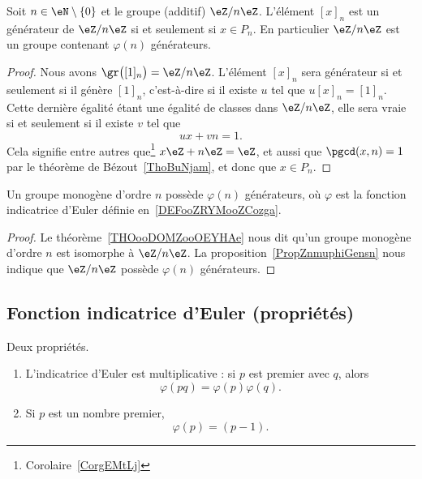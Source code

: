 \begin{proposition}     \label{PropZnmuphiGensn}
	Soit \( n\in\eN\setminus\{ 0 \}\) et le groupe (additif) \( \eZ/n\eZ\). L'élément \( [x]_n\) est un générateur de \( \eZ/n\eZ\) si et seulement si \( x\in P_n\). En particulier \( \eZ/n\eZ\) est un groupe contenant \( \varphi(n)\) générateurs.
\end{proposition}

\begin{proof}
	Nous avons \( \gr\big( [1]_n \big)=\eZ/n\eZ\). L'élément \( [x]_n\) sera générateur si et seulement si il génère \( [1]_n \), c'est-à-dire si il existe \( u\) tel que \( u[x]_n=[1]_n\). Cette dernière égalité étant une égalité de classes dans \( \eZ/n\eZ\), elle sera vraie si et seulement si il existe \( v\) tel que
	\begin{equation}
		ux+vn=1.
	\end{equation}
	Cela signifie entre autres que\footnote{Corolaire~\ref{CorgEMtLj}} \( x\eZ+n\eZ=\eZ\), et aussi que \( \pgcd(x,n)=1\) par le théorème de Bézout~\ref{ThoBuNjam}, et donc que \( x\in P_n\).
\end{proof}

\begin{corollary}\label{CORooMBLSooMHKmAq}
	Un groupe monogène d'ordre \( n\) possède \( \varphi(n)\) générateurs, où \( \varphi\) est la fonction indicatrice d'Euler définie en~\ref{DEFooZRYMooZCozga}.
\end{corollary}

\begin{proof}
	Le théorème~\ref{THOooDOMZooOEYHAe} nous dit qu'un groupe monogène d'ordre \( n\) est isomorphe à \( \eZ/n\eZ\). La proposition~\ref{PropZnmuphiGensn} nous indique que \( \eZ/n\eZ\) possède \( \varphi(n)\) générateurs.
\end{proof}

\subsection{Fonction indicatrice d'Euler (propriétés)}
\label{subSecKGDFooAbETjs}

\begin{corollary}       \label{CorlvTmsf}
	Deux propriétés.
	\begin{enumerate}
		\item
		      L'indicatrice d'Euler est multiplicative : si \( p\) est premier avec \( q\), alors
		      \begin{equation}
			      \varphi(pq)=\varphi(p)\varphi(q).
		      \end{equation}
		\item
		      Si \( p\) est un nombre premier,
		      \begin{equation}
			      \varphi(p)=(p-1).
		      \end{equation}
	\end{enumerate}
\end{corollary}

